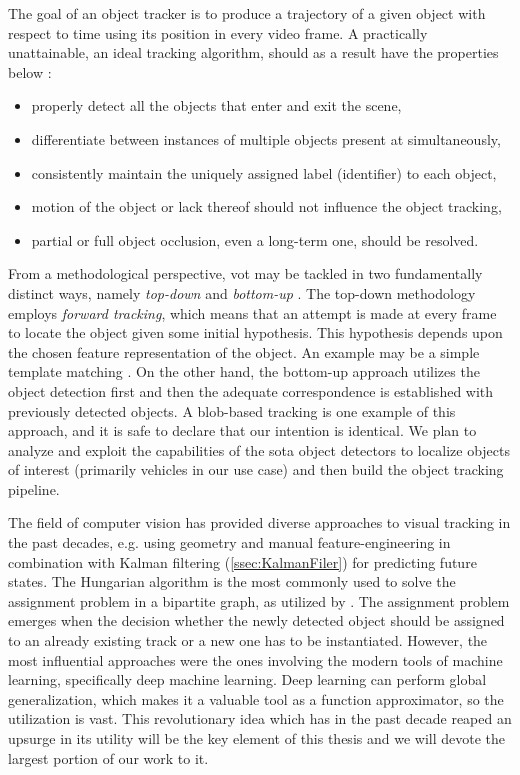 The goal of an object tracker is to produce a trajectory of a given object with respect to time using its position in every video frame. A practically unattainable, an ideal tracking algorithm, should as a result have the properties below \cite{Jalal2012}:

\begin{itemize}
    \item properly detect all the objects that enter and exit the scene,
    \item differentiate between instances of multiple objects present at simultaneously,
    \item consistently maintain the uniquely assigned label (identifier) to each object,
    \item motion of the object or lack thereof should not influence the object tracking,
    \item partial or full object occlusion, even a long-term one, should be resolved.
\end{itemize}

From a methodological perspective, \gls{vot} may be tackled in two fundamentally distinct ways, namely \emph{top-down} and \emph{bottom-up} \cite{Jalal2012}. The top-down methodology employs \emph{forward tracking}, which means that an attempt is made at every frame to locate the object given some initial hypothesis. This hypothesis depends upon the chosen feature representation of the object. An example may be a simple template matching \cite{comaniciu2003kernel}. On the other hand, the bottom-up approach utilizes the object detection first and then the adequate correspondence is established with previously detected objects. A \gls{blob}-based tracking \cite{wren1997pfinder} is one example of this approach, and it is safe to declare that our intention is identical. We plan to analyze and exploit the capabilities of the \gls{sota} object detectors to localize objects of interest (primarily vehicles in our use case) and then build the object tracking pipeline.

The field of computer vision has provided diverse approaches to visual tracking in the past decades, e.g. using geometry and manual feature-engineering in combination with Kalman filtering \cite{Kalman1960} (\cref{ssec:KalmanFiler}) for predicting future states. The Hungarian algorithm \cite{Kuhn55thehungarian} is the most commonly used to solve the assignment problem in a bipartite graph, as utilized by \cite{Bewley2016}. The assignment problem emerges when the decision whether the newly detected object should be assigned to an already existing track or a new one has to be instantiated. However, the most influential approaches were the ones involving the modern tools of machine learning, specifically deep machine learning. Deep learning can perform global generalization, which makes it a valuable tool as a function approximator, so the utilization is vast. This revolutionary idea which has in the past decade reaped an upsurge in its utility will be the key element of this thesis and we will devote the largest portion of our work to it.

